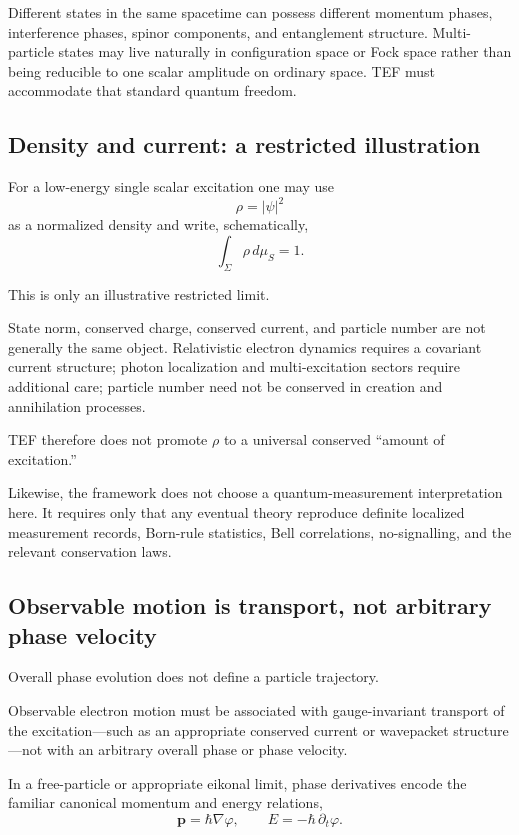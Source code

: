 \documentclass[10pt]{article}
\begin{document}
Different states in the same spacetime can possess different momentum phases, interference phases, spinor components, and entanglement structure. Multi-particle states may live naturally in configuration space or Fock space rather than being reducible to one scalar amplitude on ordinary space. TEF must accommodate that standard quantum freedom.

\subsection{Density and current: a restricted illustration}\label{density-and-current-a-restricted-illustration}

For a low-energy single scalar excitation one may use \[
\rho=|\psi|^2
\] as a normalized density and write, schematically, \[
\int_\Sigma \rho\,d\mu_S=1.
\]

This is only an illustrative restricted limit.

State norm, conserved charge, conserved current, and particle number are not generally the same object. Relativistic electron dynamics requires a covariant current structure; photon localization and multi-excitation sectors require additional care; particle number need not be conserved in creation and annihilation processes.

TEF therefore does not promote \(\rho\) to a universal conserved ``amount of excitation.''

Likewise, the framework does not choose a quantum-measurement interpretation here. It requires only that any eventual theory reproduce definite localized measurement records, Born-rule statistics, Bell correlations, no-signalling, and the relevant conservation laws.

\subsection{Observable motion is transport, not arbitrary phase velocity}\label{observable-motion-is-transport-not-arbitrary-phase-velocity}

Overall phase evolution does not define a particle trajectory.

Observable electron motion must be associated with gauge-invariant transport of the excitation---such as an appropriate conserved current or wavepacket structure---not with an arbitrary overall phase or phase velocity.

In a free-particle or appropriate eikonal limit, phase derivatives encode the familiar canonical momentum and energy relations, \[
\mathbf p=\hbar\nabla\varphi,
\qquad
E=-\hbar\,\partial_t\varphi.
\]
\end{document}
